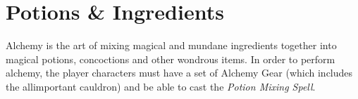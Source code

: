 
\makeatletter
{}
\makeatother
\def\q{4.2}
\def\g{0.75}
\def\h{1.95}
\def\l{1.45}
\renewcommand{\potion}[1]
{
\setkeys{potion}{name=None}
	\setkeys{potion}{#1}
	\vbox{
	{\normalsize \color{rulered}\name }

	{\it \visible}
	
	
	
	\vspace{1ex}
	\begin{tabular}{>{\centering\arraybackslash}m{\g cm} >{\centering\arraybackslash}m{\h cm} >{\centering\arraybackslash}m{\g cm} >{\centering\arraybackslash}m{\l cm}}
		\bf Cost	&	\bf Mixing Time	&\bf Dose&	\bf Difficulty 
		\\
		\cost{}	&	\time{}	& \dose{}&	\difficulty{} 
	\end{tabular}

\vspace{1 ex}
{\bf Ingredients}:~~		\parbox[t]{\q cm}{ \raggedright \essential}
	
}
	{\raggedright \effect}
	
	
	{\bf Optional Ingredients:}
	
	\begin{tabular}{m{\h cm} >{\centering\arraybackslash}m{\g cm} >{\centering\arraybackslash}m{1  cm} }
		\bf Name	&	\bf Bonus	&\bf DV Cost
		\\
		\optional{}
	\end{tabular}
	
	{\bf Side Effect:} ~~ \parbox[t]{\q cm}{ \raggedright \side}
	
	\vspace{3 ex}
}

\onecolumn
\chapter{Potions \& Ingredients}	

Alchemy is the art of mixing magical and mundane ingredients together into magical potions, concoctions and other wondrous items. In order to perform alchemy, the player characters must have a set of Alchemy Gear (which includes the all\minus{}important cauldron) and be able to cast the {\it Potion Mixing Spell}. 

